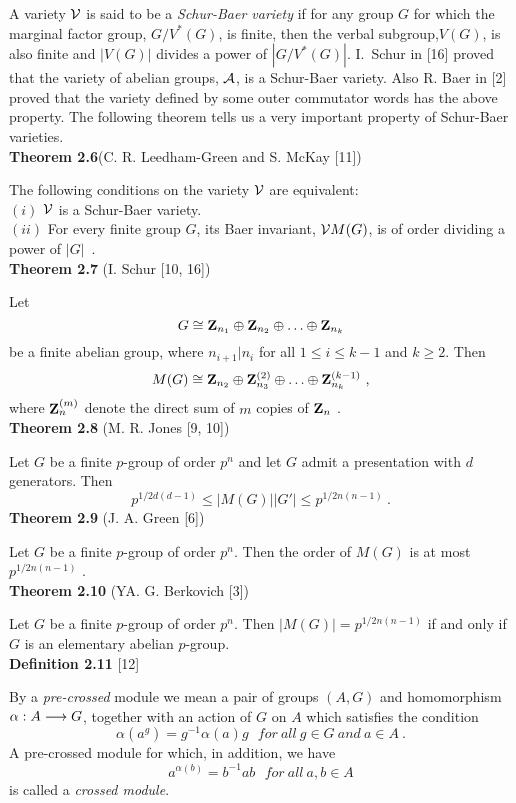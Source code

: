  A variety $\cal V$ is said to be a {\it Schur-Baer variety} if for any group
$G$ for which the marginal factor group, $G/V^*(G)$, is finite, then the verbal
subgroup,$V(G)$, is also finite and $|V(G)|$ divides a power of $|G/V^*(G)|$.
I.\ Schur in [16] proved that the variety of abelian groups, $\cal A$, is a
Schur-Baer variety. Also R. Baer in [2] proved that the variety defined by some
outer commutator words has the above property.
 The following theorem tells us a very important property of Schur-Baer
varieties.\\
{\bf Theorem 2.6}(C. R. Leedham-Green and S. McKay [11])

 The following conditions on the variety $\cal V$ are equivalent:\\
$(i)$ $\cal V$ is a Schur-Baer variety.\\
$(ii)$ For every finite group $G$, its Baer invariant, ${\cal V}M(G)$, is of
order dividing a power of $|G|$\ .\\
{\bf Theorem 2.7} (I. Schur [10, 16])

 Let
$$ G\cong {\bf Z}_{n_1}\oplus {\bf Z}_{n_2}\oplus \ldots \oplus {\bf Z}_{n_k}$$
be a finite abelian group,
where $n_{i+1}|n_i$ for all $1\leq i\leq k-1$ and $k\geq 2$. Then
$$ M(G)\cong {\bf Z}_{n_2}\oplus {\bf
Z}_{n_3}^{(2)}\oplus \ldots \oplus {\bf
Z}_{n_k}^{(k-1)} \ ,$$
where ${\bf Z}_n^{(m)}$ denote the direct sum of $m$ copies of ${\bf Z}_n$ .\\
{\bf Theorem 2.8} (M. R. Jones [9, 10])

 Let $G$ be a finite $p$-group of order $p^n$ and let $G$ admit a presentation
with $d$ generators. Then
$$ p^{1/2d(d-1)}\leq |M(G)||G'|\leq p^{1/2n(n-1)}\ .$$
{\bf Theorem 2.9} (J. A. Green [6])

 Let $G$ be a finite $p$-group of order $p^n$. Then the order of $M(G)$ is at
most $p^{1/2n(n-1)}$ .\\
{\bf Theorem 2.10} (YA. G. Berkovich [3])

 Let $G$ be a finite $p$-group of order $p^n$. Then $|M(G)|=p^{1/2n(n-1)}$ if and
only if $G$ is an elementary abelian $p$-group.\\
{\bf Definition 2.11} [12]

 By a {\it pre-crossed} module we mean a pair of groups $(A,G)$ and
homomorphism
$\alpha :A\longrightarrow G$, together with an action of $G$ on $A$ which satisfies the
condition
$$ \alpha(a^g)=g^{-1}\alpha(a)g\ \ \ for\ all\ g\in G\ and\ a\in A\ .$$
A pre-crossed module for which, in addition, we have
$$ a^{\alpha(b)}=b^{-1}ab\ \ \ for\ all\ a,b\in A $$
is called a {\it crossed module}.

